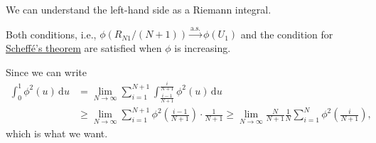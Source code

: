 \begin{intuition}
	We can understand the left-hand side as a Riemann integral.
\end{intuition}

\begin{eg}
	Both conditions, i.e., \(\phi (R_{N1} / (N+1)) \overset{\text{a.s.} }{\to} \phi (U_1)\) and the condition for \hyperref[thm:Scheffe]{Scheffé's theorem} are satisfied when \(\phi \) is increasing.
\end{eg}
\begin{explanation}
	Since we can write
	\[
		\begin{split}
			\int_{0}^{1} \phi ^2(u) \,\mathrm{d}u
			 & = \lim_{N \to \infty} \sum_{i=1}^{N+1} \int_{\frac{i-1}{N+1}}^{\frac{i}{N+1}} \phi ^2 (u) \,\mathrm{d}u \\
			 & \geq \lim_{N \to \infty} \sum_{i=1}^{N+1} \phi ^2\left( \frac{i-1}{N+1} \right) \cdot \frac{1}{N+1}
			\geq \lim_{N \to \infty} \frac{N}{N+1} \frac{1}{N} \sum_{i=1}^{N} \phi ^2\left( \frac{i}{N+1} \right),
		\end{split}
	\]
	which is what we want.
\end{explanation}